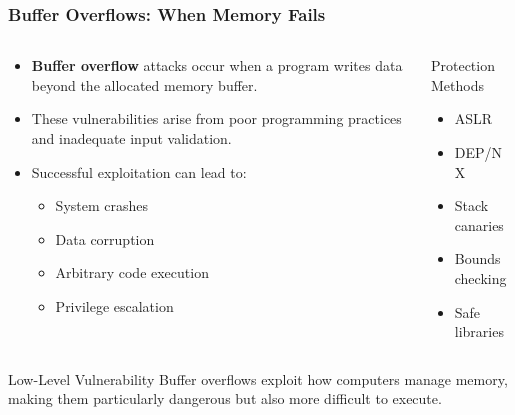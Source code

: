 \documentclass{beamer}
\begin{document}
\begin{frame}
    \frametitle{Buffer Overflows: When Memory Fails}
    
    \begin{columns}
        \begin{column}{0.6\textwidth}
            \begin{itemize}
                \item \textbf{Buffer overflow} attacks occur when a program writes data beyond the allocated memory buffer.
                \item These vulnerabilities arise from poor programming practices and inadequate input validation.
                \item Successful exploitation can lead to:
                    \begin{itemize}
                        \item System crashes
                        \item Data corruption
                        \item Arbitrary code execution
                        \item Privilege escalation
                    \end{itemize}
            \end{itemize}
        \end{column}
        \begin{column}{0.4\textwidth}
            \begin{alertblock}{Protection Methods}
                \begin{itemize}
                    \item ASLR
                    \item DEP/NX
                    \item Stack canaries
                    \item Bounds checking
                    \item Safe libraries
                \end{itemize}
            \end{alertblock}
        \end{column}
    \end{columns}
    
    \begin{block}{Low-Level Vulnerability}
        Buffer overflows exploit how computers manage memory, making them particularly dangerous but also more difficult to execute.
    \end{block}
\end{frame}
\end{document}
